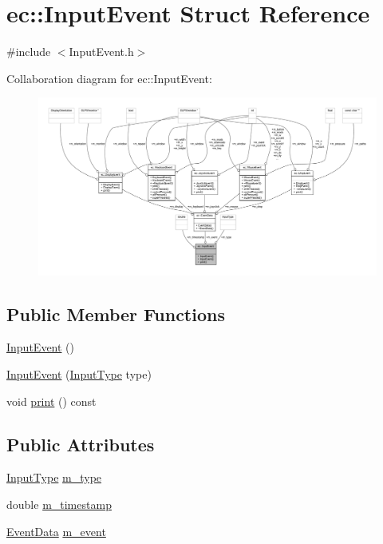 \hypertarget{structec_1_1_input_event}{}\section{ec\+:\+:Input\+Event Struct Reference}
\label{structec_1_1_input_event}


{\ttfamily \#include $<$Input\+Event.\+h$>$}



Collaboration diagram for ec\+:\+:Input\+Event\+:\nopagebreak
\begin{figure}[H]
\begin{center}
\leavevmode
\includegraphics[width=350pt]{structec_1_1_input_event__coll__graph}
\end{center}
\end{figure}
\subsection*{Public Member Functions}
\begin{DoxyCompactItemize}
\item 
\mbox{\hyperlink{structec_1_1_input_event_a0e1dd98eb4e1161bdb573afe429d07c8}{Input\+Event}} ()
\item 
\mbox{\hyperlink{structec_1_1_input_event_af8894b724a61a63412f4e6df14a49d7a}{Input\+Event}} (\mbox{\hyperlink{namespaceec_ae2d697393ea83b34b18ab14eb5dacbca}{Input\+Type}} type)
\item 
void \mbox{\hyperlink{structec_1_1_input_event_a778cd0afc60db1b127585a54c61b9e75}{print}} () const
\end{DoxyCompactItemize}
\subsection*{Public Attributes}
\begin{DoxyCompactItemize}
\item 
\mbox{\hyperlink{namespaceec_ae2d697393ea83b34b18ab14eb5dacbca}{Input\+Type}} \mbox{\hyperlink{structec_1_1_input_event_a07aadaf18da2952478b803bbd4122bb7}{m\+\_\+type}}
\item 
double \mbox{\hyperlink{structec_1_1_input_event_ada54908facf585cb714bd6712d8f6c4d}{m\+\_\+timestamp}}
\item 
\mbox{\hyperlink{unionec_1_1_event_data}{Event\+Data}} \mbox{\hyperlink{structec_1_1_input_event_a10c6d0183b009da26bac115528c3da36}{m\+\_\+event}}
\end{DoxyCompactItemize}



